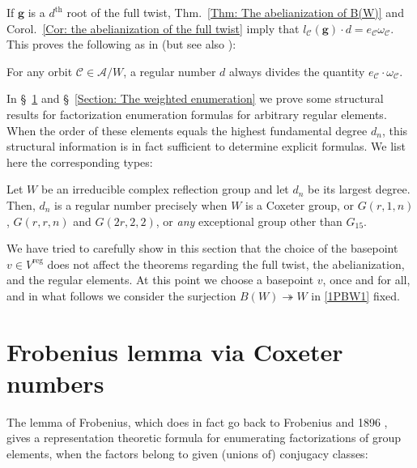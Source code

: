 \documentclass[ALCO, Unicode]{cedram}
\newcommand{\op}[1]{\operatorname{#1}}
\newcommand{\op}[1]{\operatorname{#1}}
\begin{document}
If $\bm g$ is a $d^{\text{th}}$ root of the full twist, Thm.~\ref{Thm: The abelianization of B(W)} and Corol.~\ref{Cor: the abelianization of the full twist} imply that $l_{\mathcal{C}}(\bm g)\cdot d=e_{\mathcal{C}}\omega_{\mathcal{C}}$. This proves the following as in \cite[Thm.~3.2]{reiner-delMas-Hameister} (but see also \cite[Prop.~5.17:(2)]{broue-book-braid-groups}):

\begin{coro}\label{Corol: regular numbers divide e_co_c}
For any orbit $\mathcal{C}\in\mathcal{A}/W$, a regular number $d$ always divides the quantity $e_{\mathcal{C}}\cdot\omega_\mathcal{C}$.
\end{coro}


In \S~\ref{Section: Frobenius lemma via Coxeter numbers} and \S~\ref{Section: The weighted enumeration} we prove some structural results for factorization enumeration formulas for arbitrary regular elements. When the order of these elements equals the highest fundamental degree $d_n$, this structural information is in fact sufficient to determine explicit formulas. We list here the corresponding types:

\begin{prop}\label{Prop: When d_n is regular}
Let $W$ be an irreducible complex reflection group and let $d_n$ be its largest degree. Then, $d_n$ is a regular number precisely when $W$ is a Coxeter group, or $G(r,1,n)$, $G(r,r,n)$ and $G(2r,2,2)$, or \emph{any} exceptional group other than $G_{15}$.
\end{prop} 

\begin{rema}\label{Remark: We can disregard the basepoint}
We have tried to carefully show in this section that the choice of the basepoint $v\in V^{\op{reg}}$ does not affect the theorems regarding the full twist, the abelianization, and the regular elements. At this point we choose a basepoint $v$, once and for all, and in what follows we consider the surjection $B(W)\twoheadrightarrow W$ in \eqref{1PBW1} fixed.
\end{rema}

\section{Frobenius lemma via Coxeter numbers}
\label{Section: Frobenius lemma via Coxeter numbers}

The lemma of Frobenius, which does in fact go back to Frobenius and 1896 \cite{frobenius-collected-works}, gives a representation theoretic formula for enumerating factorizations of group elements, when the factors belong to given (unions of) conjugacy classes:
\end{document}
